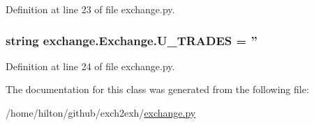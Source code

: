 Definition at line 23 of file exchange.\-py.

\hypertarget{classexchange_1_1_exchange_aafa0e023de170f51cbf9d48e1154587a}{
\subsubsection[{U\-\_\-\-T\-R\-A\-D\-E\-S}]{\setlength{\rightskip}{0pt plus 5cm}string exchange.\-Exchange.\-U\-\_\-\-T\-R\-A\-D\-E\-S = ''\hspace{0.3cm}{\ttfamily [static]}}}\label{classexchange_1_1_exchange_aafa0e023de170f51cbf9d48e1154587a}


Definition at line 24 of file exchange.\-py.



The documentation for this class was generated from the following file\-:\begin{DoxyCompactItemize}
\item 
/home/hilton/github/exch2exh/\hyperlink{exchange_8py}{exchange.\-py}\end{DoxyCompactItemize}

